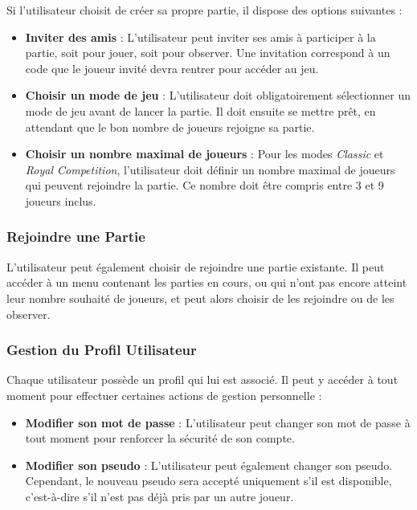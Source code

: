 \documentclass{report}
\begin{document}
\noindent Si l'utilisateur choisit de créer sa propre partie, il dispose des options suivantes :
\begin{itemize}
    \item \textbf{Inviter des amis} : L'utilisateur peut inviter ses amis à participer à la partie, soit pour jouer, soit pour observer. Une invitation correspond à un code que le joueur invité devra rentrer pour accéder au jeu.
    \item \textbf{Choisir un mode de jeu} : L'utilisateur doit obligatoirement sélectionner un mode de jeu avant de lancer la partie. Il doit ensuite se mettre prêt, en attendant que le bon nombre de joueurs rejoigne sa partie.
    \item \textbf{Choisir un nombre maximal de joueurs} : Pour les modes \emph{Classic} et \emph{Royal Competition}, l'utilisateur doit définir un nombre maximal de joueurs qui peuvent rejoindre la partie. Ce nombre doit être compris entre 3 et 9 joueurs inclus.
\end{itemize}

\subsubsection{Rejoindre une Partie}

\noindent L'utilisateur peut également choisir de rejoindre une partie existante. Il peut accéder à un menu contenant les parties en cours, ou qui n'ont pas encore atteint leur nombre souhaité de joueurs, et peut alors choisir de les rejoindre ou de les observer.

\subsubsection{Gestion du Profil Utilisateur}

\noindent Chaque utilisateur possède un profil qui lui est associé. Il peut y accéder à tout moment pour effectuer certaines actions de gestion personnelle :
\begin{itemize}
    \item \textbf{Modifier son mot de passe} : L'utilisateur peut changer son mot de passe à tout moment pour renforcer la sécurité de son compte.
    \item \textbf{Modifier son pseudo} : L'utilisateur peut également changer son pseudo. Cependant, le nouveau pseudo sera accepté uniquement s'il est disponible, c'est-à-dire s'il n'est pas déjà pris par un autre joueur.
\end{itemize}
\end{document}
